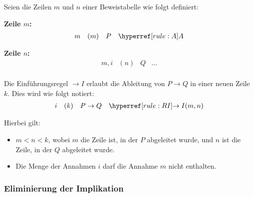 \documentclass[main.tex]{subfiles}
\begin{document}
\begin{definition}
Seien die Zeilen \( m \) und \( n \) einer Beweistabelle wie folgt definiert:

\textbf{Zeile \( m \):}
\[
\begin{array}{llll}
    m & (m) & P & \rA \\
\end{array}
\]

\textbf{Zeile \( n \):}
\[
\begin{array}{llll}
    m,i & (n) & Q & \dots \\
\end{array}
\]

Die Einführungsregel \(\rightarrow I\) erlaubt die Ableitung von \( P \rightarrow Q \) in einer neuen Zeile \( k \). Dies wird wie folgt notiert:
\[
\begin{array}{llll}
    i & (k) & P \rightarrow Q & \rRI{m,n} \\
\end{array}
\]

Hierbei gilt:
\begin{itemize}
    \item \(m < n < k\), wobei \(m\) die Zeile ist, in der \(P\) abgeleitet wurde, und \(n\) ist die Zeile, in der \(Q\) abgeleitet wurde.
    \item Die Menge der Annahmen \(i\) darf die Annahme \(m\) nicht enthalten.
\end{itemize}
\end{definition}

\subsubsection{Eliminierung der Implikation}
\label{rule:RE}
\end{document}
